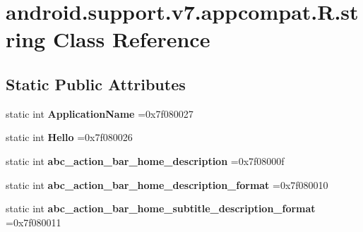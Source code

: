 \hypertarget{classandroid_1_1support_1_1v7_1_1appcompat_1_1R_1_1string}{}\section{android.\+support.\+v7.\+appcompat.\+R.\+string Class Reference}
\label{classandroid_1_1support_1_1v7_1_1appcompat_1_1R_1_1string}
\subsection*{Static Public Attributes}
\begin{DoxyCompactItemize}
\item 
\mbox{\label{classandroid_1_1support_1_1v7_1_1appcompat_1_1R_1_1string_af7cd2766876ceaa32b8d64cfaf860e95}} 
static int {\bfseries Application\+Name} =0x7f080027
\item 
\mbox{\label{classandroid_1_1support_1_1v7_1_1appcompat_1_1R_1_1string_ad4e84a2cc708fd0cfcaf2da785149e0e}} 
static int {\bfseries Hello} =0x7f080026
\item 
\mbox{\label{classandroid_1_1support_1_1v7_1_1appcompat_1_1R_1_1string_aee6b2c0957780877baf737cc1fb20dda}} 
static int {\bfseries abc\+\_\+action\+\_\+bar\+\_\+home\+\_\+description} =0x7f08000f
\item 
\mbox{\label{classandroid_1_1support_1_1v7_1_1appcompat_1_1R_1_1string_a82bb20ae321fe34e2d65889da37d9ab2}} 
static int {\bfseries abc\+\_\+action\+\_\+bar\+\_\+home\+\_\+description\+\_\+format} =0x7f080010
\item 
\mbox{\label{classandroid_1_1support_1_1v7_1_1appcompat_1_1R_1_1string_aabaf19de27ceb9ab03c8235fde51ca74}} 
static int {\bfseries abc\+\_\+action\+\_\+bar\+\_\+home\+\_\+subtitle\+\_\+description\+\_\+format} =0x7f080011
\item 
\mbox{\label{classandroid_1_1support_1_1v7_1_1appcompat_1_1R_1_1string_a62347c827114ee87dd9e142bebcb008d}} 

\end{DoxyCompactItemize}
